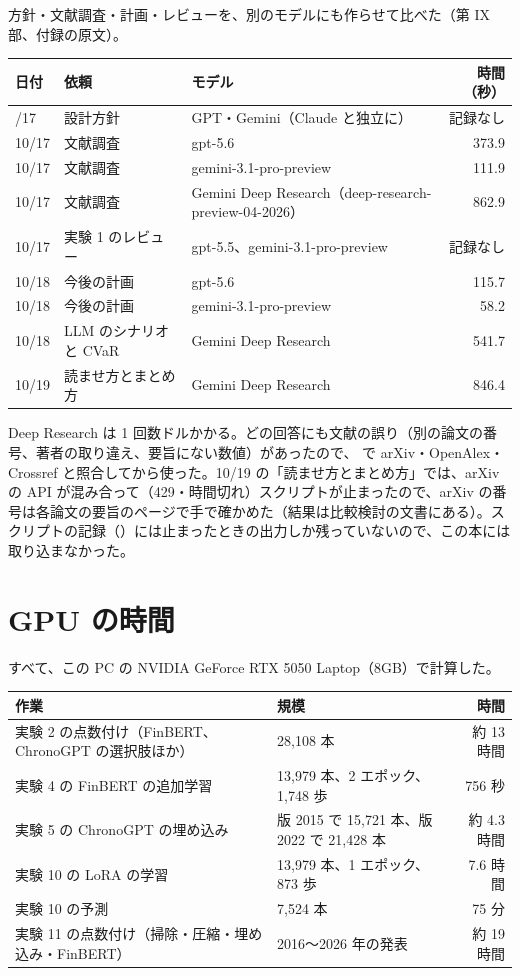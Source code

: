 方針・文献調査・計画・レビューを、別のモデルにも作らせて比べた（第 IX 部、付録の原文）。

\begin{longtable}{P{2.4cm}P{3.6cm}P{4.0cm}r}
\toprule
\textbf{日付} & \textbf{依頼} & \textbf{モデル} & \textbf{時間（秒）} \\
\midrule
\endhead
\bottomrule
{}/17 & 設計方針 & GPT・Gemini（Claude と独立に） & 記録なし \\
10/17 & 文献調査 & gpt-5.6 & 373.9 \\
10/17 & 文献調査 & gemini-3.1-pro-preview & 111.9 \\
10/17 & 文献調査 & Gemini Deep Research（deep-research-preview-04-2026） & 862.9 \\
10/17 & 実験 1 のレビュー & gpt-5.5、gemini-3.1-pro-preview & 記録なし \\
10/18 & 今後の計画 & gpt-5.6 & 115.7 \\
10/18 & 今後の計画 & gemini-3.1-pro-preview & 58.2 \\
10/18 & LLM のシナリオと CVaR & Gemini Deep Research & 541.7 \\
10/19 & 読ませ方とまとめ方 & Gemini Deep Research & 846.4 \\
\end{longtable}

Deep Research は 1 回数ドルかかる。どの回答にも文献の誤り（別の論文の番号、著者の取り違え、要旨にない数値）があったので、 で arXiv・OpenAlex・Crossref と照合してから使った。10/19 の「読ませ方とまとめ方」では、arXiv の API が混み合って（429・時間切れ）スクリプトが止まったので、arXiv の番号は各論文の要旨のページで手で確かめた（結果は比較検討の文書にある）。スクリプトの記録（）には止まったときの出力しか残っていないので、この本には取り込まなかった。

\section{GPU の時間}

すべて、この PC の NVIDIA GeForce RTX 5050 Laptop（8GB）で計算した。

\begin{longtable}{P{5.6cm}P{5.0cm}r}
\toprule
\textbf{作業} & \textbf{規模} & \textbf{時間} \\
\midrule
\endhead
\bottomrule
\endfoot
実験 2 の点数付け（FinBERT、ChronoGPT の選択肢ほか） & 28,108 本 & 約 13 時間 \\
実験 4 の FinBERT の追加学習 & 13,979 本、2 エポック、1,748 歩 & 756 秒 \\
実験 5 の ChronoGPT の埋め込み & 版 2015 で 15,721 本、版 2022 で 21,428 本 & 約 4.3 時間 \\
実験 10 の LoRA の学習 & 13,979 本、1 エポック、873 歩 & 7.6 時間 \\
実験 10 の予測 & 7,524 本 & 75 分 \\
実験 11 の点数付け（掃除・圧縮・埋め込み・FinBERT） & 2016〜2026 年の発表 & 約 19 時間 \\
\end{longtable}

